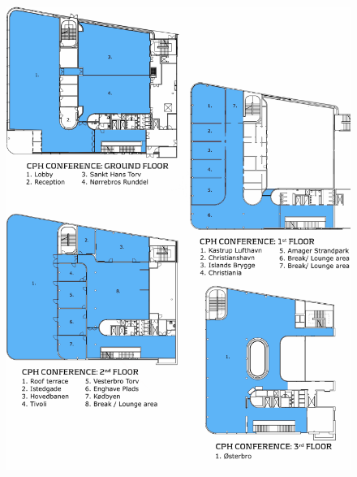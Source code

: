 \begin{figure}[p]
\centering
\includegraphics[width=\textwidth]{content/floorplan_DGI_w_grid.pdf}
\end{figure}

